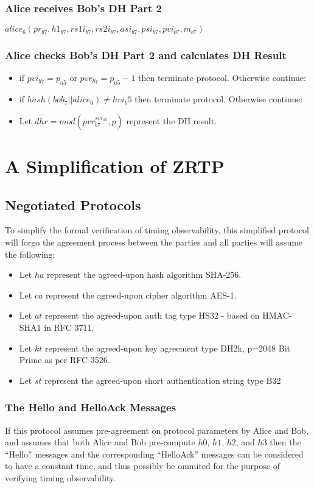 \documentclass[11pt]{article}
\begin{document}
  \subsubsection{Alice receives Bob's DH Part 2}
  $alice_6(pr_{b7},h1_{b7},rs1i_{b7},rs2i_{b7},asi_{b7},
           psi_{b7},pvi_{b7},m_{b7})$
  \subsubsection{Alice checks Bob's DH Part 2 and calculates DH 
               Result}
  \begin{itemize}
    \item if $pvi_{b7} = p_{a5}$ or $pvr_{b7} = p_{a5} - 1$ then 
          terminate protocol. Otherwise continue:
    \item if $hash(bob_7 || alice_0) \neq hvi_b5$ then terminate 
          protocol. Otherwise continue:
    \item Let $dhr = mod(pvr_{b7}^{svi_{a5}},p)$ represent the 
          DH result.
  \end{itemize}
  \section{A Simplification of ZRTP}
  \subsection{Negotiated Protocols}
  To simplify the formal verification of timing observability, 
  this simplified protocol will forgo the agreement process between
  the parties and all parties will assume the following:
  \begin{itemize}
    \item Let $ha$ represent the agreed-upon hash algorithm 
          SHA-256.
    \item Let $ca$ represent the agreed-upon cipher algorithm 
          AES-1.
    \item Let $at$ represent the agreed-upon auth tag type
          HS32 - based on HMAC-SHA1 in RFC 3711.
    \item Let $kt$ represent the agreed-upon key agreement
          type DH2k, p=2048 Bit Prime as per RFC 3526.
    \item Let $st$ represent the agreed-upon short authentication
          string type B32
  \end{itemize}
  \subsubsection{The Hello and HelloAck Messages}
  If this protocol assumes pre-agreement on protocol parameters
  by Alice and Bob, and assumes that both Alice and Bob pre-compute
  $h0$, $h1$, $h2$, and $h3$ then the ``Hello'' messages and the 
  corresponding ``HelloAck'' messages can be considered to have
  a constant time, and thus possibly be ommited for the purpose of
  verifying timing observability.
\end{document}

